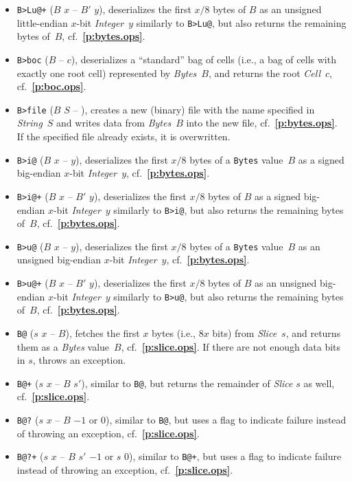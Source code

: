 \documentclass[12pt,oneside]{article}
\def\refpoint#1{{\rm\textbf{\ref{#1}}}}
\let\ptref=\refpoint
\begin{document}
\begin{itemize}
\item {\tt B>Lu@+} ($B$ $x$ -- $B'$ $y$), deserializes the first $x/8$ bytes of $B$ as an unsigned little-endian $x$-bit {\em Integer}~$y$ similarly to {\tt B>Lu@}, but also returns the remaining bytes of~$B$, cf.~\ptref{p:bytes.ops}.
\item {\tt B>boc} ($B$ -- $c$), deserializes a ``standard'' bag of cells (i.e., a bag of cells with exactly one root cell) represented by {\em Bytes\/}~$B$, and returns the root {\em Cell\/}~$c$, cf.~\ptref{p:boc.ops}.
\item {\tt B>file} ($B$ $S$ -- ), creates a new (binary) file with the name specified in {\em String\/}~$S$ and writes data from {\em Bytes}~$B$ into the new file, cf.~\ptref{p:bytes.ops}. If the specified file already exists, it is overwritten.
\item {\tt B>i@} ($B$ $x$ -- $y$), deserializes the first $x/8$ bytes of a {\tt Bytes} value~$B$ as a signed big-endian $x$-bit {\em Integer}~$y$, cf.~\ptref{p:bytes.ops}.
\item {\tt B>i@+} ($B$ $x$ -- $B'$ $y$), deserializes the first $x/8$ bytes of $B$ as a signed big-endian $x$-bit {\em Integer}~$y$ similarly to {\tt B>i@}, but also returns the remaining bytes of~$B$, cf.~\ptref{p:bytes.ops}.
\item {\tt B>u@} ($B$ $x$ -- $y$), deserializes the first $x/8$ bytes of a {\tt Bytes} value~$B$ as an unsigned big-endian $x$-bit {\em Integer}~$y$, cf.~\ptref{p:bytes.ops}.
\item {\tt B>u@+} ($B$ $x$ -- $B'$ $y$), deserializes the first $x/8$ bytes of $B$ as an unsigned big-endian $x$-bit {\em Integer}~$y$ similarly to {\tt B>u@}, but also returns the remaining bytes of~$B$, cf.~\ptref{p:bytes.ops}.
\item {\tt B@} ($s$ $x$ -- $B$), fetches the first $x$ bytes (i.e., $8x$ bits) from {\em Slice}~$s$, and returns them as a {\em Bytes\/} value~$B$, cf.~\ptref{p:slice.ops}. If there are not enough data bits in $s$, throws an exception.
\item {\tt B@+} ($s$ $x$ -- $B$ $s'$), similar to {\tt B@}, but returns the remainder of {\em Slice\/} $s$ as well, cf.~\ptref{p:slice.ops}.
\item {\tt B@?} ($s$ $x$ -- $B$ $-1$ or $0$), similar to {\tt B@}, but uses a flag to indicate failure instead of throwing an exception, cf.~\ptref{p:slice.ops}.
\item {\tt B@?+} ($s$ $x$ -- $B$ $s'$ $-1$ or $s$ $0$), similar to {\tt B@+}, but uses a flag to indicate failure instead of throwing an exception, cf.~\ptref{p:slice.ops}.

\end{itemize}
\end{document}
